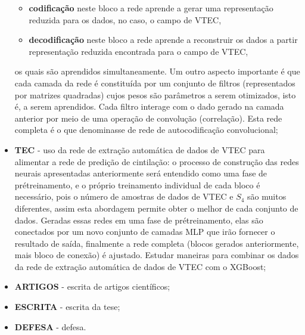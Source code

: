 \begin{itemize}
\begin{itemize}
\item {\bf codificação} neste bloco a rede aprende a gerar uma representação reduzida para os dados, no caso, o campo de VTEC,
\item {\bf decodificação} neste bloco a rede aprende a reconstruir os dados a partir representação reduzida encontrada para o campo de VTEC,
\end{itemize}
os quais são aprendidos simultaneamente. Um outro aspecto importante é que cada camada da rede é constituída por um conjunto de filtros (representados por matrizes quadradas) cujos pesos são parâmetros a serem otimizados, isto é, a serem aprendidos. Cada filtro interage com o dado gerado na camada anterior por meio de uma operação de convolução (correlação). Esta rede completa é o que denominasse de rede de autocodificação convolucional;
\item {\bf TEC} - uso da rede de extração automática de dados de VTEC para alimentar a rede de predição de cintilação: o processo de construção das redes neurais apresentadas anteriormente será entendido como uma fase de prétreinamento, e o próprio treinamento individual de cada bloco é necessário, pois o número de amostras de dados de VTEC e $S_4$ são muitos diferentes, assim esta abordagem permite obter o melhor de cada conjunto de dados. Geradas essas redes em uma fase de prétreinamento, elas são conectados por um novo conjunto de camadas MLP que irão fornecer o resultado de saída, finalmente a rede completa (blocos gerados anteriormente, mais bloco de conexão) é ajustado. Estudar maneiras para combinar os dados da rede de extração automática de dados de VTEC com o XGBoost;
\item {\bf ARTIGOS} - escrita de artigos científicos;
\item {\bf ESCRITA} - escrita da tese;
\item {\bf DEFESA} - defesa.
\end{itemize}

